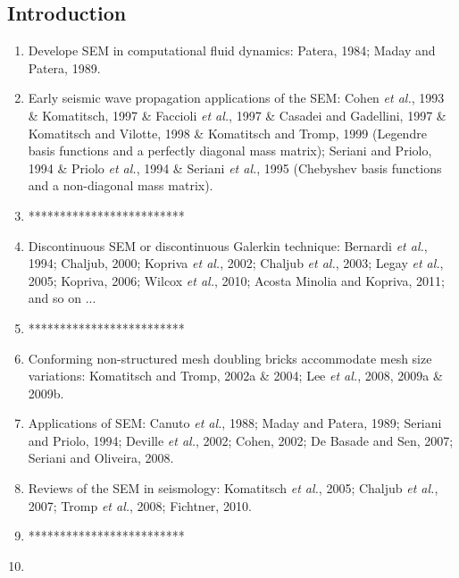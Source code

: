 \documentclass{article}
\newcommand{\prf}{This is relative path from \Papth to the paper file}
\newcommand{\pmk}{This is the brief info.}
\newcommand{\pti}{This is the paper tile}
\newcommand{\pay}{These are authors and year}
\newcommand{\pjo}{This is the journal}
\newcommand{\pda}{This is the date}
\newcommand{\sline}{*************************}
\newcommand{\etal}{\textit{et al.}}
\begin{document}
\subsection{Introduction}
\begin{enumerate}[\hspace{10mm}*]
  \item Develope SEM in computational fluid dynamics: Patera, 1984; Maday and Patera, 1989.
  \item Early seismic wave propagation applications of the SEM: Cohen \etal, 1993 \& Komatitsch, 1997 \& Faccioli \etal, 1997 \& Casadei and Gadellini, 1997 \& Komatitsch and Vilotte, 1998 \& Komatitsch and Tromp, 1999 (Legendre basis functions and a perfectly diagonal mass matrix); Seriani and Priolo, 1994 \& Priolo \etal, 1994 \& Seriani \etal, 1995 (Chebyshev basis functions and a non-diagonal mass matrix).
  \item \sline
  \item Discontinuous SEM or discontinuous Galerkin technique: Bernardi \etal, 1994; Chaljub, 2000; Kopriva \etal, 2002; Chaljub \etal, 2003; Legay \etal, 2005; Kopriva, 2006; Wilcox \etal, 2010; Acosta Minolia and Kopriva, 2011; and so on ...
  \item \sline
  \item Conforming non-structured mesh doubling bricks accommodate mesh size variations: Komatitsch and Tromp, 2002a \& 2004; Lee \etal, 2008, 2009a \& 2009b.
  \item Applications of SEM: Canuto \etal, 1988; Maday and Patera, 1989; Seriani and Priolo, 1994; Deville \etal, 2002; Cohen, 2002; De Basade and Sen, 2007; Seriani and Oliveira, 2008.
  \item Reviews of the SEM in seismology: Komatitsch \etal, 2005; Chaljub \etal, 2007; Tromp \etal, 2008; Fichtner, 2010.
  \item \sline
  \item
\end{enumerate}\par

\vspace{5mm}








\renewcommand{\pmk}{Moghaddam\_2013\_Geophy\_Stochastic gradient method}
\renewcommand{\prf}{FWI/\pmk.pdf}
\renewcommand{\pti}{A new optimizatioin approach for source-encoding full-waveform inversion}
\renewcommand{\pay}{Peyman P. Moghaddam, Henk Keers, Felix J. Herrmann, \etal, 2013}
\renewcommand{\pjo}{Geophysics}
\renewcommand{\pda}{2017/6/11 Sun.}
\end{document}
